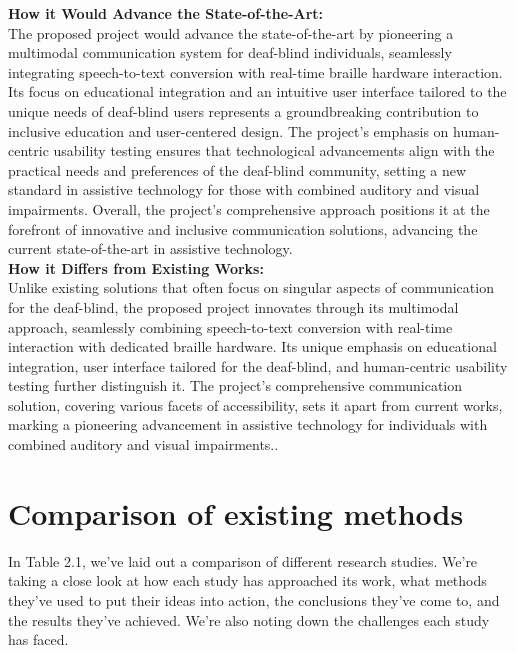 \documentclass[12pt,a4paper]{report}
\begin{document}
\noindent
\textbf{How it Would Advance the State-of-the-Art:} \\
The proposed project would advance the state-of-the-art by pioneering a multimodal communication system for deaf-blind individuals, seamlessly integrating speech-to-text conversion with real-time braille hardware interaction. Its focus on educational integration and an intuitive user interface tailored to the unique needs of deaf-blind users represents a groundbreaking contribution to inclusive education and user-centered design. The project's emphasis on human-centric usability testing ensures that technological advancements align with the practical needs and preferences of the deaf-blind community, setting a new standard in assistive technology for those with combined auditory and visual impairments. Overall, the project's comprehensive approach positions it at the forefront of innovative and inclusive communication solutions, advancing the current state-of-the-art in assistive technology. \\

\noindent
\textbf{How it Differs from Existing Works:} \\
Unlike existing solutions that often focus on singular aspects of communication for the deaf-blind, the proposed project innovates through its multimodal approach, seamlessly combining speech-to-text conversion with real-time interaction with dedicated braille hardware. Its unique emphasis on educational integration, user interface tailored for the deaf-blind, and human-centric usability testing further distinguish it. The project's comprehensive communication solution, covering various facets of accessibility, sets it apart from current works, marking a pioneering advancement in assistive technology for individuals with combined auditory and visual impairments.. 
\section{Comparison of existing methods}
In Table 2.1, we've laid out a comparison of different research studies. We're taking a close look at how each study has approached its work, what methods they've used to put their ideas into action, the conclusions they've come to, and the results they've achieved. We're also noting down the challenges each study has faced.
\end{document}
